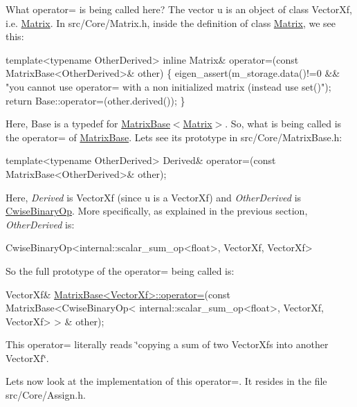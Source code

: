 What operator= is being called here? The vector u is an object of class Vector\+Xf, i.\+e. \hyperlink{group___core___module_class_eigen_1_1_matrix}{Matrix}. In src/\+Core/\+Matrix.\+h, inside the definition of class \hyperlink{group___core___module_class_eigen_1_1_matrix}{Matrix}, we see this\+: 
\begin{DoxyCode}
\textcolor{keyword}{template}<\textcolor{keyword}{typename} OtherDerived>
\textcolor{keyword}{inline} Matrix& operator=(\textcolor{keyword}{const} MatrixBase<OtherDerived>& other)
\{
  eigen\_assert(m\_storage.data()!=0 && \textcolor{stringliteral}{"you cannot use operator= with a non initialized matrix (instead use
       set()"});
  \textcolor{keywordflow}{return} Base::operator=(other.derived());
\}
\end{DoxyCode}
 Here, Base is a typedef for \hyperlink{group___core___module_class_eigen_1_1_matrix_base}{Matrix\+Base}$<$\hyperlink{group___core___module_class_eigen_1_1_matrix}{Matrix}$>$. So, what is being called is the operator= of \hyperlink{group___core___module_class_eigen_1_1_matrix_base}{Matrix\+Base}. Let\textquotesingle{}s see its prototype in src/\+Core/\+Matrix\+Base.\+h\+: 
\begin{DoxyCode}
\textcolor{keyword}{template}<\textcolor{keyword}{typename} OtherDerived>
Derived& operator=(\textcolor{keyword}{const} MatrixBase<OtherDerived>& other);
\end{DoxyCode}
 Here, {\itshape Derived} is Vector\+Xf (since u is a Vector\+Xf) and {\itshape Other\+Derived} is \hyperlink{group___core___module_class_eigen_1_1_cwise_binary_op}{Cwise\+Binary\+Op}. More specifically, as explained in the previous section, {\itshape Other\+Derived} is\+: 
\begin{DoxyCode}
CwiseBinaryOp<internal::scalar\_sum\_op<float>, VectorXf, VectorXf>
\end{DoxyCode}
 So the full prototype of the operator= being called is\+: 
\begin{DoxyCode}
VectorXf& \hyperlink{group___core___module_a706a4dd1ee54786e9210de1a4bf02600}{MatrixBase<VectorXf>::operator=}(\textcolor{keyword}{const} MatrixBase<CwiseBinaryOp<
      internal::scalar\_sum\_op<float>, VectorXf, VectorXf> > & other);
\end{DoxyCode}
 This operator= literally reads \char`\"{}copying a sum of two Vector\+Xf\textquotesingle{}s into another Vector\+Xf\char`\"{}.

Let\textquotesingle{}s now look at the implementation of this operator=. It resides in the file src/\+Core/\+Assign.\+h.


